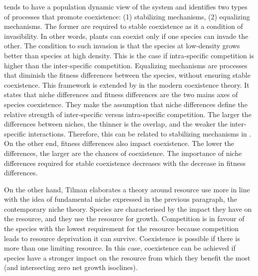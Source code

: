 \citet{chesson_mechanisms_2000} tends to have a population dynamic view of the system and identifies two types of processes that promote coexistence: (1) stabilizing mechanisms, (2) equalizing mechanisms. The former are required to stable coexistence as it a condition of invasibility. In other words, plants can coexist only if one species can invade the other. The condition to such invasion is that the species at low-density grows better than species at high density. This is the case if intra-specific competition is higher than the inter-specific competition. Equalizing mechanisms are processes that diminish the fitness differences between the species, without ensuring stable coexistence. This framework is extended by \citet{adler_niche_2007} in the modern coexistence theory. It states that niche differences \parencite{levine_importance_2009} and fitness differences are the two mains axes of species coexistence. They make the assumption that niche differences define the relative strength of inter-specific versus intra-specific competition. The larger the differences between niches, the thinner is the overlap, and the weaker the inter-specific interactions. Therefore, this can be related to stabilizing mechanisms in \citet{chesson_general_2000}. On the other end, fitness differences also impact coexistence. The lower the differences, the larger are the chances of coexistence. The importance of niche differences required for stable coexistence decreases with the decrease in fitness differences.

On the other hand, Tilman elaborates a theory \parencite{tilman_resource_1982, tilman_plant_1988} around resource use more in line with the idea of fundamental niche expressed in the previous paragraph, the contemporary niche theory. Species are characterised by the impact they have on the resource, and they use the resource for growth. Competition is in favour of the species with the lowest requirement for the resource because competition leads to resource deprivation it can survive. Coexistence is possible if there is more than one limiting resource. In this case, coexistence can be achieved if species have a stronger impact on the resource from which they benefit the most (and intersecting zero net growth isoclines). 



